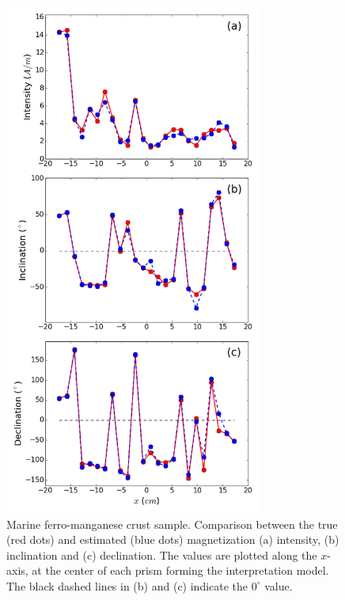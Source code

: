 \documentclass[galley,gc]{agutex}
\begin{document}
 \begin{figure}
 \noindent \includegraphics[width=20pc]{Figs/Fig12_LQ.png}
 \caption{Marine ferro-manganese crust sample. Comparison between the true (red dots)
 and estimated (blue dots) magnetization (a) intensity, (b) inclination 
 and (c) declination.
 The values are plotted along the $x$-axis, at the center of each 
 prism forming the interpretation model.
 The black dashed lines in (b) and (c) indicate the $0^{\circ}$ value.}
 \label{fig:estimate-oda}
 \end{figure}
\end{document}
